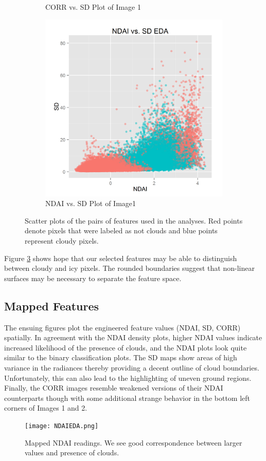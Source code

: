 \documentclass{article}\usepackage[]{graphicx}\usepackage[]{color}
\begin{document}
\begin{figure}[h]
\begin{subfigure}[b]{0.3\textwidth}
    \caption{CORR vs. SD Plot of Image 1}
    \label{CorrSd}
  \end{subfigure}  
  \begin{subfigure}[b]{0.3\textwidth}
    \includegraphics[width=\linewidth]{NDAI_vs_SD.png}
    \caption{NDAI vs. SD Plot of Image1}
    \label{NdaiSd}
  \end{subfigure}
  \caption{Scatter plots of the pairs of features used in the analyses. Red points denote pixels that were labeled as not clouds and blue points represent cloudy pixels.}
  \label{fig:Scatter}
\end{figure}
Figure \ref{fig:Scatter} shows hope that our selected features may be able to distinguish between cloudy and icy pixels.  The rounded boundaries suggest that non-linear surfaces may be necessary to separate the feature space.

\subsection{Mapped Features}
The ensuing figures plot the engineered feature values (NDAI, SD, CORR) spatially. In agreement with the NDAI density plots, higher NDAI values indicate increased likelihood of the presence of clouds, and the NDAI plots look quite similar to the binary classification plots. The SD maps show areas of high variance in the radiances thereby providing a decent outline of cloud boundaries. Unfortunately, this can also lead to the highlighting of uneven ground regions. Finally, the CORR images resemble weakened versions of their NDAI counterparts though with some additional strange behavior in the bottom left corners of Images 1 and 2. 
\begin{figure}[H]
\texttt{[image: NDAIEDA.png]}
\caption{Mapped NDAI readings. We see good correspondence between larger values and presence of clouds.}
\end{figure}
\end{document}
